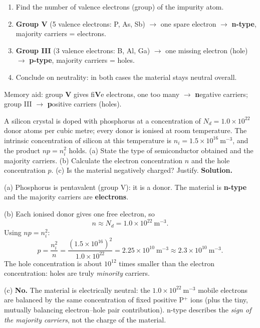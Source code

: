 \documentclass[11pt]{article}
\begin{document}
\begin{methode}
\begin{enumerate}
\item Find the number of valence electrons (group) of the impurity atom.
\item \textbf{Group V} (5 valence electrons: P, As, Sb) $\rightarrow$ one spare electron $\rightarrow$ \textbf{n-type}, majority carriers = electrons.
\item \textbf{Group III} (3 valence electrons: B, Al, Ga) $\rightarrow$ one missing electron (hole) $\rightarrow$ \textbf{p-type}, majority carriers = holes.
\item Conclude on neutrality: in both cases the material stays neutral overall.
\end{enumerate}
Memory aid: group \textbf{V} gives fi\textbf{V}e electrons, one too many $\rightarrow$ \textbf{n}egative carriers; group III $\rightarrow$ \textbf{p}ositive carriers (holes).
\end{methode}

\begin{exoresolu}
A silicon crystal is doped with phosphorus at a concentration of $N_d = 1.0\times 10^{22}$ donor atoms per cubic metre; every donor is ionised at room temperature. The intrinsic concentration of silicon at this temperature is $n_i = 1.5\times 10^{16}\ \mathrm{m^{-3}}$, and the product $np = n_i^2$ holds. (a) State the type of semiconductor obtained and the majority carriers. (b) Calculate the electron concentration $n$ and the hole concentration $p$. (c) Is the material negatively charged? Justify.
\tcblower
\textbf{Solution.}\par
(a) Phosphorus is pentavalent (group V): it is a donor. The material is \textbf{n-type} and the majority carriers are \textbf{electrons}.\par
(b) Each ionised donor gives one free electron, so
\[
n \approx N_d = 1.0\times 10^{22}\ \mathrm{m^{-3}}.
\]
Using $np = n_i^2$:
\[
p = \frac{n_i^2}{n} = \frac{(1.5\times 10^{16})^2}{1.0\times 10^{22}} = 2.25\times 10^{10}\ \mathrm{m^{-3}} \approx 2.3\times 10^{10}\ \mathrm{m^{-3}}.
\]
The hole concentration is about $10^{12}$ times smaller than the electron concentration: holes are truly \emph{minority} carriers.\par
(c) \textbf{No.} The material is electrically neutral: the $1.0\times 10^{22}\ \mathrm{m^{-3}}$ mobile electrons are balanced by the same concentration of fixed positive P$^+$ ions (plus the tiny, mutually balancing electron--hole pair contribution). n-type describes the \emph{sign of the majority carriers}, not the charge of the material.
\end{exoresolu}
\end{document}
